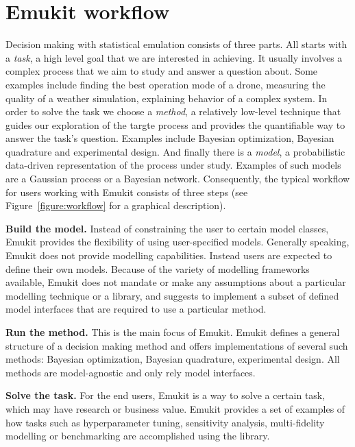 \section{Emukit workflow}\label{sec:workflow}
Decision making with statistical emulation consists of three parts. All starts with a \textit{task}, a high level goal that we are interested in achieving. It usually involves a complex process that we aim to study and answer a question about. Some examples include finding the best operation mode of a drone, measuring the quality of a weather simulation, explaining behavior of a complex system. In order to solve the task we choose a \textit{method}, a relatively low-level technique that guides our exploration of the targte process and provides the quantifiable way to answer the task's question. Examples include Bayesian optimization, Bayesian quadrature and experimental design. And finally there is a \textit{model}, a probabilistic data-driven representation of the process under study. Examples of such models are a Gaussian process or a Bayesian network. Consequently, the typical workflow for users working with Emukit consists of three steps (see Figure~\ref{figure:workflow} for a graphical description).

\textbf{Build the model.} Instead of constraining the user to certain model classes, Emukit provides the flexibility of using user-specified models. Generally speaking, Emukit does not provide modelling capabilities. Instead users are expected to define their own models. Because of the variety of modelling frameworks available, Emukit does not mandate or make any assumptions about a particular modelling technique or a library, and suggests to implement a subset of defined model interfaces that are required to use a particular method.

\textbf{Run the method.} This is the main focus of Emukit. Emukit defines a general structure of a decision making method and offers implementations of several such methods: Bayesian optimization, Bayesian quadrature, experimental design. All methods are model-agnostic and only rely model interfaces.

\textbf{Solve the task.} For the end users, Emukit is a way to solve a certain task, which may have research or business value. Emukit provides a set of examples of how tasks such as hyperparameter tuning, sensitivity analysis, multi-fidelity modelling or benchmarking are accomplished using the library.

